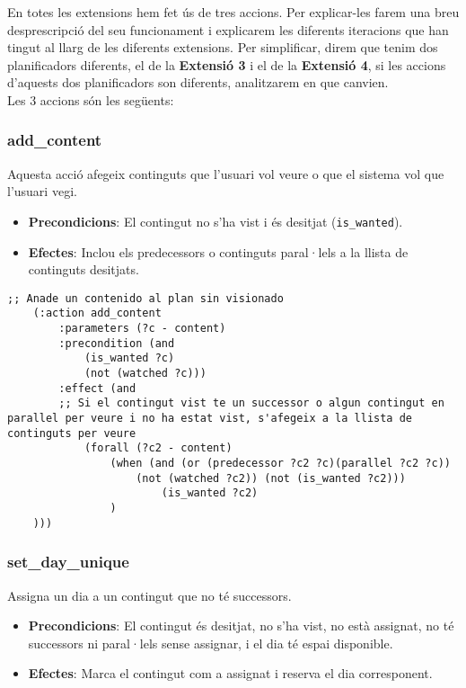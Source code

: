 \documentclass[a4paper]{article}
\begin{document}
	En totes les extensions hem fet ús de tres accions. Per explicar-les farem una breu desprescripció del seu funcionament i explicarem les diferents iteracions que han tingut al llarg de les diferents extensions. Per simplificar, direm que tenim dos planificadors diferents, el de la \textbf{Extensió 3} i el de la \textbf{Extensió 4}, si les accions d'aquests dos planificadors son diferents, analitzarem en que canvien. \\
	
	Les 3 accions són les següents:
	
	\subsubsection*{add\_content}
	
	Aquesta acció afegeix continguts que l'usuari vol veure o que el sistema vol que l'usuari vegi.
	
	\begin{itemize}
		\item \textbf{Precondicions}: El contingut no s'ha vist i és desitjat (\texttt{is\_wanted}).
		\item \textbf{Efectes}: Inclou els predecessors o continguts paral·lels a la llista de continguts desitjats.
	\end{itemize}
	
	\begin{lstlisting}[language=PDDL, caption={Acció add\_content}, label={lst:add_content}]
	;; Anade un contenido al plan sin visionado
	(:action add_content
		:parameters (?c - content)
		:precondition (and 
			(is_wanted ?c)
			(not (watched ?c)))
		:effect (and 
		;; Si el contingut vist te un successor o algun contingut en parallel per veure i no ha estat vist, s'afegeix a la llista de continguts per veure
			(forall (?c2 - content)
				(when (and (or (predecessor ?c2 ?c)(parallel ?c2 ?c))
					(not (watched ?c2)) (not (is_wanted ?c2)))
						(is_wanted ?c2)
				)		
	)))
	\end{lstlisting}
	
	\subsubsection*{set\_day\_unique}
	
	Assigna un dia a un contingut que no té successors.
	
	\begin{itemize}
		\item \textbf{Precondicions}: El contingut és desitjat, no s'ha vist, no està assignat, no té successors ni paral·lels sense assignar, i el dia té espai disponible.
		\item \textbf{Efectes}: Marca el contingut com a assignat i reserva el dia corresponent.
	\end{itemize}
	
\end{document}
